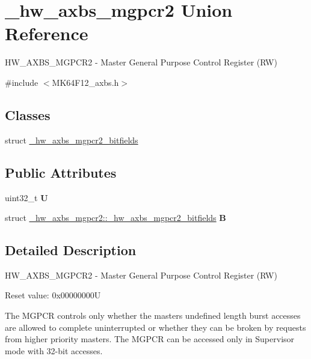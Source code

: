\hypertarget{union__hw__axbs__mgpcr2}{}\section{\+\_\+hw\+\_\+axbs\+\_\+mgpcr2 Union Reference}
\label{union__hw__axbs__mgpcr2}


H\+W\+\_\+\+A\+X\+B\+S\+\_\+\+M\+G\+P\+C\+R2 -\/ Master General Purpose Control Register (RW)  




{\ttfamily \#include $<$M\+K64\+F12\+\_\+axbs.\+h$>$}

\subsection*{Classes}
\begin{DoxyCompactItemize}
\item 
struct \hyperlink{struct__hw__axbs__mgpcr2_1_1__hw__axbs__mgpcr2__bitfields}{\+\_\+hw\+\_\+axbs\+\_\+mgpcr2\+\_\+bitfields}
\end{DoxyCompactItemize}
\subsection*{Public Attributes}
\begin{DoxyCompactItemize}
\item 
uint32\+\_\+t {\bfseries U}\hypertarget{union__hw__axbs__mgpcr2_a714006a585bd78eadca9839427365a5c}{}\label{union__hw__axbs__mgpcr2_a714006a585bd78eadca9839427365a5c}

\item 
struct \hyperlink{struct__hw__axbs__mgpcr2_1_1__hw__axbs__mgpcr2__bitfields}{\+\_\+hw\+\_\+axbs\+\_\+mgpcr2\+::\+\_\+hw\+\_\+axbs\+\_\+mgpcr2\+\_\+bitfields} {\bfseries B}\hypertarget{union__hw__axbs__mgpcr2_a94f099dd17236c776531122d8d70769c}{}\label{union__hw__axbs__mgpcr2_a94f099dd17236c776531122d8d70769c}

\end{DoxyCompactItemize}


\subsection{Detailed Description}
H\+W\+\_\+\+A\+X\+B\+S\+\_\+\+M\+G\+P\+C\+R2 -\/ Master General Purpose Control Register (RW) 

Reset value\+: 0x00000000U

The M\+G\+P\+CR controls only whether the master\textquotesingle{}s undefined length burst accesses are allowed to complete uninterrupted or whether they can be broken by requests from higher priority masters. The M\+G\+P\+CR can be accessed only in Supervisor mode with 32-\/bit accesses. 

